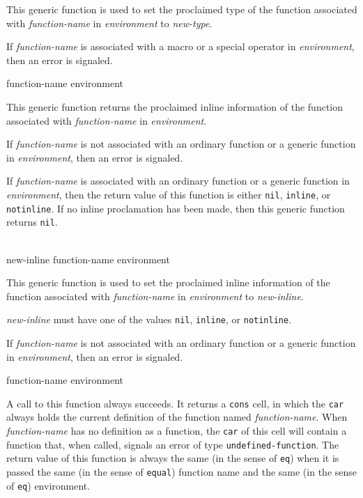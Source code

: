 This generic function is used to set the proclaimed type of the
function associated with \textit{function-name} in
\textit{environment} to \textit{new-type}.

If \textit{function-name} is associated with a macro or a special
operator in \textit{environment}, then an error is signaled.

 {function-name environment}

This generic function returns the proclaimed inline information of the
function associated with \textit{function-name} in
\textit{environment}.

If \textit{function-name} is not associated with an ordinary function
or a generic function in \textit{environment}, then an error is
signaled.

If \textit{function-name} is associated with an ordinary function or a
generic function in \textit{environment}, then the return value of
this function is either \texttt{nil}, \texttt{inline}, or
\texttt{notinline}.  If no inline proclamation has been made, then
this generic function returns \texttt{nil}.

\\
{new-inline function-name environment}

This generic function is used to set the proclaimed inline information
of the function associated with \textit{function-name} in
\textit{environment} to \textit{new-inline}.

\textit{new-inline} must have one of the values \texttt{nil},
\texttt{inline}, or \texttt{notinline}.

If \textit{function-name} is not associated with an ordinary function
or a generic function in \textit{environment}, then an error is
signaled.

 {function-name environment}

A call to this function always succeeds.  It returns a \texttt{cons}
cell, in which the \texttt{car} always holds the current definition of
the function named \textit{function-name}.  When
\textit{function-name} has no definition as a function, the
\texttt{car} of this cell will contain a function that, when called,
signals an error of type \texttt{undefined-function}.  The return
value of this function is always the same (in the sense of
\texttt{eq}) when it is passed the same (in the sense of
\texttt{equal}) function name and the same (in the sense of
\texttt{eq}) environment.

